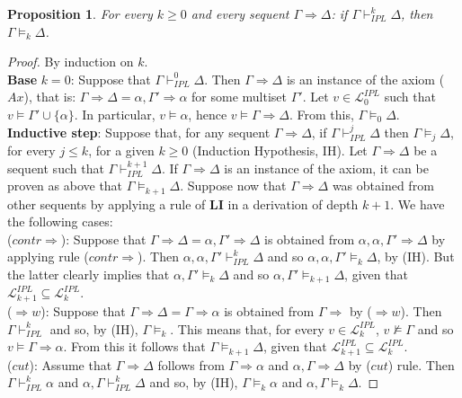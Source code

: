 \documentclass[12pt]{article}
\newtheorem{proposition}[theorem]{Proposition}
\begin{document}
\begin{proposition} \label{seq-rules-sound}
For every $k \geq 0$ and every sequent $\Gamma \Rightarrow\Delta$: if $\Gamma \vdash_{IPL}^k \Delta$, then $\Gamma\models_k\Delta$.
\end{proposition}
\begin{proof}
By induction on $k$.\\[1mm]
%
{\bf Base} $k=0$: Suppose that $\Gamma \vdash_{IPL}^0 \Delta$. Then  $\Gamma \Rightarrow\Delta$ is an instance of the axiom ($Ax$), that is:  $\Gamma \Rightarrow\Delta = \alpha,\Gamma' \Rightarrow \alpha$ for some multiset $\Gamma'$. Let $v \in \mathcal{L}_0^{IPL}$ such that $v \models \Gamma' \cup \{\alpha\}$. In particular, $v \models \alpha$, hence $v \models \Gamma \Rightarrow\Delta$. From this,  $\Gamma \models_0 \Delta$.\\[1mm]
%
{\bf Inductive step}: Suppose that, for any sequent  $\Gamma \Rightarrow\Delta$, if $\Gamma \vdash_{IPL}^j \Delta$ then  $\Gamma\models_j\Delta$, for every $j \leq k$, for a given $k \geq 0$ (Induction Hypothesis, IH). Let $\Gamma \Rightarrow\Delta$ be a sequent such that $\Gamma \vdash_{IPL}^{k+1} \Delta$. If $\Gamma \Rightarrow \Delta$ is an instance of the axiom, it can be proven as above that  $\Gamma\models_{k+1}\Delta$. Suppose now that $\Gamma \Rightarrow\Delta$ was obtained from other sequents by applying a rule of {\bf LI} in a derivation of depth $k+1$. We have the following cases:\\[1mm]
%
($contr\Rightarrow$): Suppose that  $\Gamma \Rightarrow\Delta= \alpha,\Gamma' \Rightarrow\Delta$ is obtained from $\alpha,\alpha,\Gamma'\Rightarrow\Delta$ by applying rule ($contr\Rightarrow$). Then $\alpha,\alpha,\Gamma' \vdash_{IPL}^k \Delta$ and so $\alpha,\alpha,\Gamma' \models_k \Delta$, by (IH). But the latter clearly implies that $\alpha,\Gamma' \models_k \Delta$ and so  $\alpha,\Gamma' \models_{k+1} \Delta$,  given that $\mathcal{L}_{k+1}^{IPL} \subseteq \mathcal{L}_k^{IPL}$.\\[1mm]
%
($\Rightarrow w$): Suppose that  $\Gamma \Rightarrow\Delta= \Gamma \Rightarrow\alpha$ is obtained from $\Gamma\Rightarrow$ by ($\Rightarrow w$). Then  $\Gamma \vdash_{IPL}^k $ and so, by (IH), $\Gamma\models_k$.  This means that, for every $v \in \mathcal{L}_k^{IPL}$, $v\not\models \Gamma$ and so $v\models\Gamma\Rightarrow \alpha$. From this it follows that $\Gamma\models_{k+1}\Delta$,  given that $\mathcal{L}_{k+1}^{IPL} \subseteq \mathcal{L}_k^{IPL}$.\\[1mm]
%
($cut$): Assume that $\Gamma \Rightarrow\Delta$ follows from $\Gamma\Rightarrow\alpha$ and $\alpha, \Gamma\Rightarrow\Delta$ by ($cut$) rule. Then  $\Gamma\vdash_{IPL}^k\alpha$ and $\alpha, \Gamma\vdash_{IPL}^k\Delta$ and so, by (IH),  $\Gamma \models_k\alpha$ and $\alpha, \Gamma \models_k\Delta$.

\end{proof}
\end{document}
